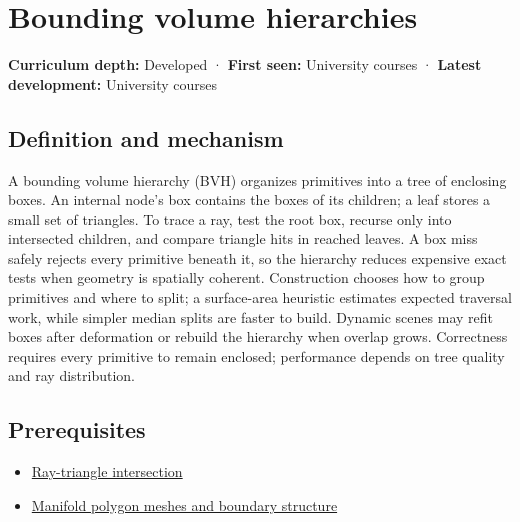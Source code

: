 \hypertarget{appendix-0b426c47dd78}{}\label{referencestart:appendix-0b426c47dd78}
\section{Bounding volume hierarchies}\label{appendix-0b426c47dd78-bounding-volume-hierarchies}

\textbf{Curriculum depth:} Developed · \textbf{First seen:} University courses · \textbf{Latest development:} University courses

\begin{allmightroledefinition}

\subsection{Definition and mechanism}\label{appendix-0b426c47dd78-definition-and-mechanism}

A bounding volume hierarchy (BVH) organizes primitives into a tree of enclosing boxes. An internal node's box contains the boxes of its children; a leaf stores a small set of triangles. To trace a ray, test the root box, recurse only into intersected children, and compare triangle hits in reached leaves. A box miss safely rejects every primitive beneath it, so the hierarchy reduces expensive exact tests when geometry is spatially coherent. Construction chooses how to group primitives and where to split; a surface-area heuristic estimates expected traversal work, while simpler median splits are faster to build. Dynamic scenes may refit boxes after deformation or rebuild the hierarchy when overlap grows. Correctness requires every primitive to remain enclosed; performance depends on tree quality and ray distribution.

\end{allmightroledefinition}

\subsection{Prerequisites}\label{appendix-0b426c47dd78-prerequisites}

\begin{itemize}
\tightlist
\item
  \hyperref[appendix-47ac1bd6d144]{Ray-triangle intersection}
\item
  \hyperref[appendix-fab348609369]{Manifold polygon meshes and boundary structure}
\end{itemize}

